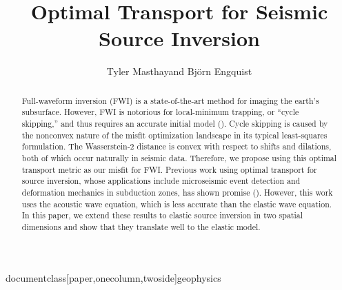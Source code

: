 documentclass[paper,onecolumn,twoside]{geophysics}

\usepackage{amsfonts}
\usepackage{amsmath}
\usepackage{dsfont}

\newcommand{\rs}[1]{\mathstrut\mbox{\scriptsize\rm #1}}
\newcommand{\rr}[1]{\mbox{\rm #1}}

\newcommand{\citensp}[1]{\hspace{1sp}\cite{#1}}
\newcommand{\bs}[1]{\boldsymbol{#1}}
\newcommand{\R}{\mathbb{R}}



\title{Optimal Transport for Seismic Source Inversion}

\renewcommand{\thefootnote}{\fnsymbol{footnote}} 

\address{
\footnotemark[1] Oden Institute, 
The University of Texas at Austin}
\author{Tyler Masthay\footnotemark[1] and Bj\"{o}rn Engquist\footnotemark[1]}



\begin{abstract}
Full-waveform inversion (FWI) is a state-of-the-art method for imaging the earth's subsurface. However, FWI is notorious for local-minimum trapping, or ``cycle skipping,'' and thus requires an accurate initial model (\citensp{metivier2018optimal}).
Cycle skipping is caused by the nonconvex nature of the misfit optimization landscape in its typical least-squares formulation.
The Wasserstein-2 distance is convex with respect to shifts and dilations, both of which occur naturally in seismic data. Therefore, we propose using this optimal transport metric as our misfit for FWI. 
Previous work using optimal transport for source inversion, whose applications include microseismic event detection and deformation mechanics in subduction zones, has shown promise (\citensp{chen2018quadratic}). However, this work uses the acoustic wave equation, which is less accurate than the elastic wave equation.
In this paper, we extend these results to elastic source inversion in two spatial dimensions and show that they translate well to the elastic model.
\end{abstract}

